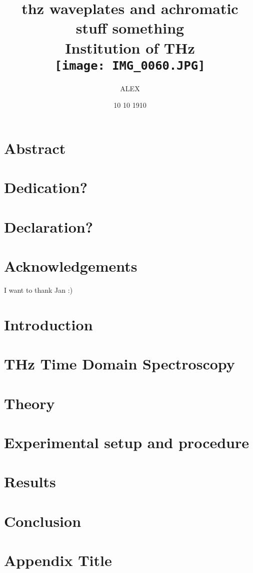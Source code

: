 \documentclass[12pt]{report}
\title{
{thz waveplates and achromatic stuff something}\\
{\large Institution of THz}\\
{\texttt{[image: IMG\_0060.JPG]}}
}
\author{ALEX}
\date{10 10 1910}
\begin{document}
\maketitle

\chapter*{Abstract}

\chapter*{Dedication?}

\chapter*{Declaration?}

\chapter*{Acknowledgements}
I want to thank Jan :)

\tableofcontents

\chapter{Introduction}


\chapter{THz Time Domain Spectroscopy}


\chapter{Theory}


\chapter{Experimental setup and procedure}


\chapter{Results}


\chapter{Conclusion}


\appendix
\chapter{Appendix Title}


\end{document}
